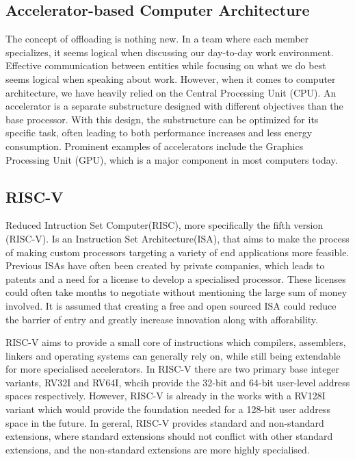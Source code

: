 \subsection{Accelerator-based Computer Architecture}
The concept of offloading is nothing new.
In a team where each member specializes, it seems logical when discussing our day-to-day work environment.
Effective communication between entities while focusing on what we do best seems logical when speaking about work.
However, when it comes to computer architecture, we have heavily relied on the Central Processing Unit (CPU).
An accelerator is a separate substructure designed with different objectives than the base processor.
With this design, the substructure can be optimized for its specific task, often leading to both performance increases and less energy consumption\cite{AA}.
Prominent examples of accelerators include the Graphics Processing Unit (GPU), which is a major component in most computers today.

\subsection{RISC-V}
Reduced Intruction Set Computer(RISC), more specifically the fifth version (RISC-V). Is an Instruction Set Architecture(ISA), that aims to make the process of
making custom processors targeting a variety of end applications more feasible. Previous ISAs have often been created by private companies, which leads to patents
and a need for a license to develop a specialised processor. These licenses could often take months to negotiate without mentioning the large sum of money involved.
It is assumed that creating a free and open sourced ISA could reduce the barrier of entry and greatly increase innovation along with afforability\cite{ISAfree}.

RISC-V aims to provide a small core of instructions which compilers, assemblers, linkers and operating systems can generally rely on, while still being extendable for more specialised
accelerators. In RISC-V there  are two primary base integer variants, RV32I and RV64I, whcih provide the 32-bit and 64-bit user-level address spaces respectively. However, RISC-V is already
in the works with a RV128I variant which would provide the foundation needed for a 128-bit user address space in the future. In gereral, RISC-V provides standard and non-standard extensions,
where standard extensions should not conflict with other standard extensions, and the non-standard extensions are more highly specialised.

